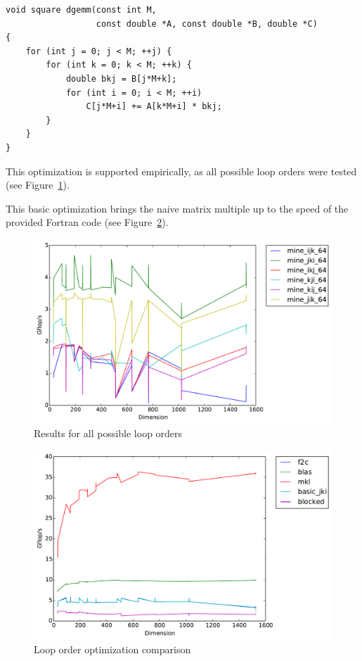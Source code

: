 \documentclass[fontsize=11pt]{scrartcl}
\numberwithin{equation}{section}        %
\numberwithin{figure}{section}          %
\numberwithin{table}{section}               %
\begin{document}
\begin{lstlisting}[frame = single, caption={Improved Loop Order Square Matrix Multiply}]
void square dgemm(const int M, 
                  const double *A, const double *B, double *C)
{
    for (int j = 0; j < M; ++j) {
        for (int k = 0; k < M; ++k) {
            double bkj = B[j*M+k];
            for (int i = 0; i < M; ++i)
                C[j*M+i] += A[k*M+i] * bkj;
        }
    }
}
\end{lstlisting}

This optimization is supported empirically, as all possible loop orders were
tested (see Figure~\ref{fig:loop_order}).

This basic optimization brings the naive matrix multiple up to the speed of
the provided Fortran code (see Figure~\ref{fig:loop_order_opt_comparison}).

\begin{figure}
    \centering
    \includegraphics[width=6.0in]{../timings/timings loop order.pdf}
    \caption{Results for all possible loop orders}
    \label{fig:loop_order}
\end{figure}

\begin{figure}
    \centering
    \includegraphics[width=6.0in]{../timings/timing show jki good.pdf}
    \caption{Loop order optimization comparison}
    \label{fig:loop_order_opt_comparison}
\end{figure}
\end{document}
